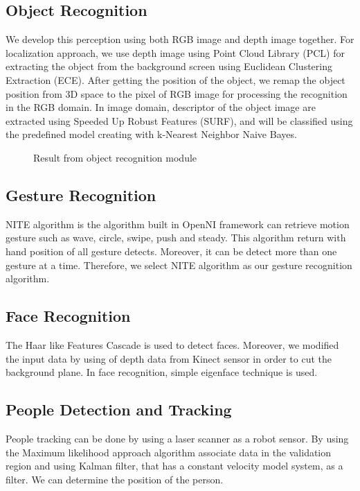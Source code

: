 \documentclass{llncs}
\begin{document}
\subsection{Object Recognition}

We develop this perception using both RGB image and depth image together. For localization approach, we use depth image using Point Cloud Library (PCL) for extracting the object from the background screen using Euclidean Clustering Extraction (ECE). After getting the position of the object, we remap the object position from 3D space to the pixel of RGB image for processing the recognition in the RGB domain. In image domain, descriptor of the object image are extracted using Speeded Up Robust Features (SURF), and will be classified using the predefined model creating with k-Nearest Neighbor Naive Bayes.

\begin{figure}
\centering
\caption{Result from object recognition module}
\label{fig:object_recog}
\end{figure}

\subsection{Gesture Recognition}

NITE algorithm is the algorithm built in OpenNI framework can retrieve motion gesture such as wave, circle, swipe, push and steady. This algorithm return with hand position of all gesture detects.
Moreover, it can be detect more than one gesture at a time. Therefore, we select NITE algorithm as our
gesture recognition algorithm.

\subsection{Face Recognition}

The Haar like Features Cascade is used to detect faces. Moreover, we modified the input data by using of depth data from Kinect sensor in order to cut the background plane. In face recognition, simple eigenface technique is used.

\subsection{People Detection and Tracking}

People tracking can be done by using a laser scanner as a robot sensor. By using the Maximum likelihood approach algorithm associate data in the validation region and using Kalman filter, that has a constant velocity model system, as a filter. We can determine the position of the person.
\end{document}
